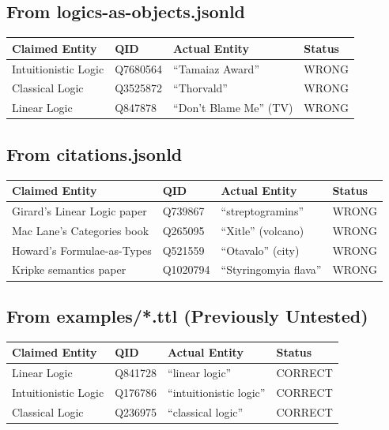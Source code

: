 \subsection*{From logics-as-objects.jsonld}

\begin{tabular}{llll}
\toprule
\textbf{Claimed Entity} & \textbf{QID} & \textbf{Actual Entity} & \textbf{Status} \\
\midrule
Intuitionistic Logic & Q7680564 & ``Tamaiaz Award'' & WRONG \\
Classical Logic & Q3525872 & ``Thorvald'' & WRONG \\
Linear Logic & Q847878 & ``Don't Blame Me'' (TV) & WRONG \\
\bottomrule
\end{tabular}

\subsection*{From citations.jsonld}

\begin{tabular}{llll}
\toprule
\textbf{Claimed Entity} & \textbf{QID} & \textbf{Actual Entity} & \textbf{Status} \\
\midrule
Girard's Linear Logic paper & Q739867 & ``streptogramins'' & WRONG \\
Mac Lane's Categories book & Q265095 & ``Xitle'' (volcano) & WRONG \\
Howard's Formulae-as-Types & Q521559 & ``Otavalo'' (city) & WRONG \\
Kripke semantics paper & Q1020794 & ``Styringomyia flava'' & WRONG \\
\bottomrule
\end{tabular}

\subsection*{From examples/*.ttl (Previously Untested)}

\begin{tabular}{llll}
\toprule
\textbf{Claimed Entity} & \textbf{QID} & \textbf{Actual Entity} & \textbf{Status} \\
\midrule
Linear Logic & Q841728 & ``linear logic'' & CORRECT \\
Intuitionistic Logic & Q176786 & ``intuitionistic logic'' & CORRECT \\
Classical Logic & Q236975 & ``classical logic'' & CORRECT \\
\bottomrule
\end{tabular}

